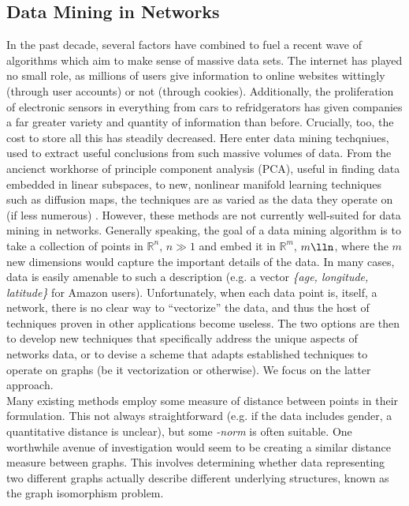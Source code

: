 \documentclass[11pt]{article}
\begin{document}
\subsection{Data Mining in Networks}
In the past decade, several factors have combined to fuel a recent wave of algorithms which aim to make sense of massive data sets. The internet has played no small role, as millions of users give information to online websites wittingly (through user accounts) or not (through cookies). Additionally, the proliferation of electronic sensors in everything from cars to refridgerators \cite{hopefully that's true} has given companies a far greater variety and quantity of information than before. Crucially, too, the cost to store all this has steadily decreased. Here enter data mining techqniues, used to extract useful conclusions from such massive volumes of data. From the ancienct workhorse of principle component analysis (PCA), useful in finding data embedded in linear subspaces, to new, nonlinear manifold learning techniques such as diffusion maps, the techniques are as varied as the data they operate on (if less numerous) \cite{data mining papers}. However, these methods are not currently well-suited for data mining in networks. Generally speaking, the goal of a data mining algorithm is to take a collection of points in $\mathbb{R}^{n}$, $n\gg1$ and embed it in $\mathbb{R}^{m}$, $m\lln$, where the $m$ new dimensions would capture the important details of the data. In many cases, data is easily amenable to such a description (e.g. a vector \textit{\{age, longitude, latitude\}} for Amazon users). Unfortunately, when each data point is, itself, a network, there is no clear way to ``vectorize'' the data, and thus the host of techniques proven in other applications become useless. The two options are then to develop new techniques that specifically address the unique aspects of networks data, or to devise a scheme that adapts established techniques to operate on graphs (be it vectorization or otherwise). We focus on the latter approach. \vspace{1mm}\\
Many existing methods employ some measure of distance between points in their formulation. This not always straightforward (e.g. if the data includes gender, a quantitative distance is unclear), but some \textit{-norm} is often suitable. One worthwhile avenue of investigation would seem to be creating a similar distance measure between graphs. This involves determining whether data representing two different graphs actually describe different underlying structures, known as the graph isomorphism problem.
\end{document}
